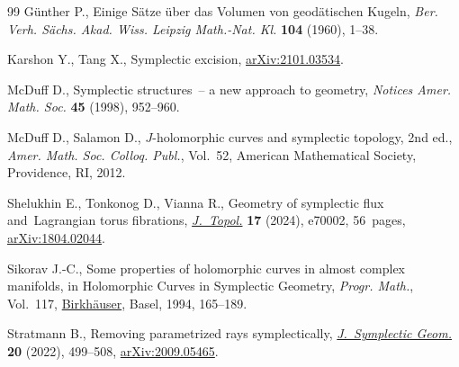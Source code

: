 \documentclass[pdftex]{sigma}
\numberwithin{equation}{section}
\theoremstyle{definition}
\begin{document}
\begin{thebibliography}{99}
G{\"u}nther P., Einige S{\"a}tze {\"u}ber das {V}olumen von geod{\"a}tischen
 {K}ugeln, \textit{Ber. Verh. S{\"a}chs. Akad. Wiss. Leipzig Math.-Nat. Kl.}
 \textbf{104} (1960), 1--38.

Karshon Y., Tang X., Symplectic excision,
 \href{http://arxiv.org/abs/2101.03534}{arXiv:2101.03534}.

McDuff D., Symplectic structures~-- a new approach to geometry, \textit{Notices
 Amer. Math. Soc.} \textbf{45} (1998), 952--960.

McDuff D., Salamon D., {$J$}-holomorphic curves and symplectic topology, 2nd ed.,
 \textit{Amer. Math. Soc. Colloq. Publ.}, Vol.~52, American
 Mathematical Society, Providence, RI, 2012.

Shelukhin E., Tonkonog D., Vianna R., Geometry of symplectic flux
 and~{L}agrangian torus fibrations,
 \href{https://doi.org/10.1112/topo.70002}{\textit{J.~Topol.}} \textbf{17}
 (2024), e70002, 56~pages,
 \href{http://arxiv.org/abs/1804.02044}{arXiv:1804.02044}.

Sikorav J.-C., Some properties of holomorphic curves in almost complex
 manifolds, in Holomorphic {C}urves in {S}ymplectic {G}eometry, \textit{Progr.
 Math.}, Vol.~117,
 \href{https://doi.org/10.1007/978-3-0348-8508-9_6}{Birkh\"auser}, Basel,
 1994, 165--189.

Stratmann B., Removing parametrized rays symplectically,
 \href{https://doi.org/10.4310/jsg.2022.v20.n2.a4}{\textit{J.~Symplectic
 Geom.}} \textbf{20} (2022), 499--508,
 \href{http://arxiv.org/abs/2009.05465}{arXiv:2009.05465}.

\end{thebibliography}\LastPageEnding
\end{document}
